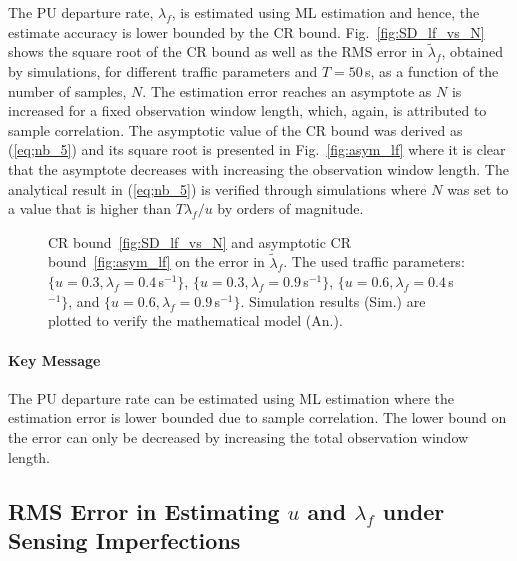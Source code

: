 \documentclass[11pt,draftclsnofoot,journal,onecolumn]{IEEEtran}
\begin{document}
The PU departure rate, $\lambda_f$, is estimated using ML estimation and hence, the estimate accuracy is lower bounded by the CR bound. Fig.~\ref{fig:SD_lf_vs_N} shows the square root of the CR bound as well as the RMS error in $\tilde{\lambda}_f$, obtained by simulations, for different traffic parameters and $T=50$\,s, as a function of the number of samples, $N$. The estimation error reaches an asymptote as $N$ is increased for a fixed observation window length, which, again, is attributed to sample correlation. The asymptotic value of the CR bound was derived as (\ref{eq;nb_5}) and its square root is presented in Fig.~\ref{fig:asym_lf} where it is clear that the asymptote decreases with increasing the observation window length. The analytical result in (\ref{eq;nb_5}) is verified through simulations where $N$ was set to a value that is higher than $T\lambda_f/u$ by orders of magnitude.
\begin{figure}
\centering
{}
\caption{CR bound~\ref{fig:SD_lf_vs_N} and asymptotic CR bound~\ref{fig:asym_lf} on the error in $\tilde{\lambda}_f$. The used traffic parameters: $\{u = 0.3, \lambda_f = 0.4$\,s$^{-1}\}$, $\{u = 0.3, \lambda_f = 0.9$\,s$^{-1}\}$, $\{u = 0.6, \lambda_f = 0.4$\,s$^{-1}\}$, and $\{u = 0.6, \lambda_f = 0.9$\,s$^{-1}\}$. Simulation results (Sim.) are plotted to verify the mathematical model (An.).}
\end{figure}

\paragraph*{Key Message}

The PU departure rate can be estimated using ML estimation where the estimation error is lower bounded due to sample correlation. The lower bound on the error can only be decreased by increasing the total observation window length.

\subsection{RMS Error in Estimating $u$ and $\lambda_f$ under Sensing Imperfections}
\label{sec:num_MSE_u_lf_se}
\end{document}
